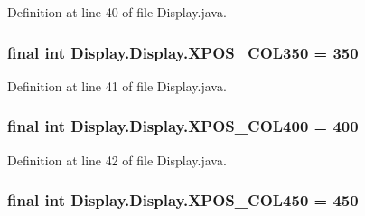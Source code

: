 Definition at line 40 of file Display.\+java.

\hypertarget{class_display_1_1_display_ac0e291caffea8a2d26755c36464c8418}{}
\subsubsection[{X\+P\+O\+S\+\_\+\+C\+O\+L350}]{\setlength{\rightskip}{0pt plus 5cm}final int Display.\+Display.\+X\+P\+O\+S\+\_\+\+C\+O\+L350 = 350\hspace{0.3cm}{\ttfamily [static]}}\label{class_display_1_1_display_ac0e291caffea8a2d26755c36464c8418}


Definition at line 41 of file Display.\+java.

\hypertarget{class_display_1_1_display_a2b04669828dc32ce7435f60985fb9e15}{}
\subsubsection[{X\+P\+O\+S\+\_\+\+C\+O\+L400}]{\setlength{\rightskip}{0pt plus 5cm}final int Display.\+Display.\+X\+P\+O\+S\+\_\+\+C\+O\+L400 = 400\hspace{0.3cm}{\ttfamily [static]}}\label{class_display_1_1_display_a2b04669828dc32ce7435f60985fb9e15}


Definition at line 42 of file Display.\+java.

\hypertarget{class_display_1_1_display_aaa4a147d3ae20ff69293868c15b0810c}{}
\subsubsection[{X\+P\+O\+S\+\_\+\+C\+O\+L450}]{\setlength{\rightskip}{0pt plus 5cm}final int Display.\+Display.\+X\+P\+O\+S\+\_\+\+C\+O\+L450 = 450\hspace{0.3cm}{\ttfamily [static]}}\label{class_display_1_1_display_aaa4a147d3ae20ff69293868c15b0810c}


